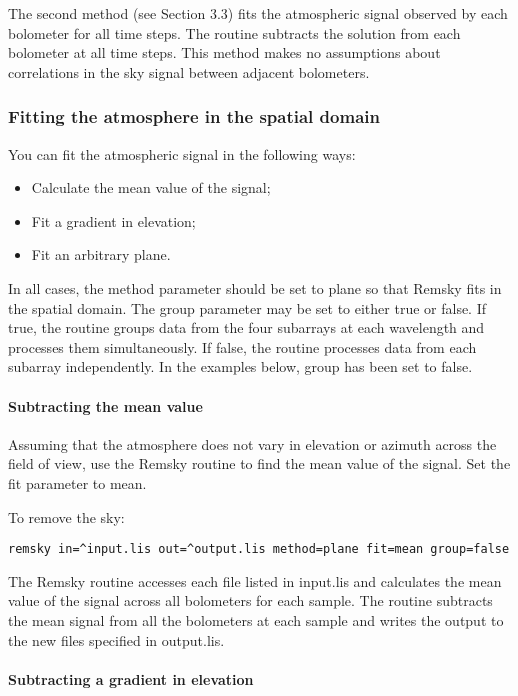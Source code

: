 \documentclass[twoside,11pt]{article}
\renewcommand{\_}{\texttt{\symbol{95}}}
\begin{document}
The second method (see Section 3.3) fits the atmospheric signal
observed by each bolometer for all time steps. The routine subtracts
the solution from each bolometer at all time steps. This method makes
no assumptions about correlations in the sky signal between adjacent
bolometers.

\subsubsection{Fitting the atmosphere in the spatial domain}

You can fit the atmospheric signal in the following ways:
\begin{itemize}
\item  Calculate the mean value of the signal;
\item  Fit a gradient in elevation;
\item  Fit an arbitrary plane.
\end{itemize}
In all cases, the method parameter should be set to plane so that
Remsky fits in the spatial domain. The group parameter may be set to
either true or false. If true, the routine groups data from the four
subarrays at each wavelength and processes them simultaneously. If
false, the routine processes data from each subarray independently. In
the examples below, group has been set to false.

\paragraph{Subtracting the mean value}

Assuming that the atmosphere does not vary in elevation or azimuth
across the field of view, use the Remsky routine to find the mean
value of the signal. Set the fit parameter to mean.

To remove the sky:
\begin{verbatim}
remsky in=^input.lis out=^output.lis method=plane fit=mean group=false
\end{verbatim}

The Remsky routine accesses each file listed in input.lis and
calculates the mean value of the signal across all bolometers for each
sample. The routine subtracts the mean signal from all the bolometers
at each sample and writes the output to the new files specified in
output.lis.

\paragraph{Subtracting a gradient in elevation}
\end{document}
